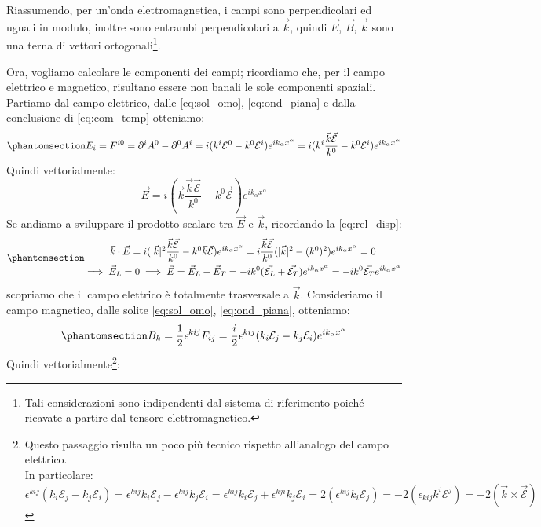 Riassumendo, per un'onda elettromagnetica, i campi sono perpendicolari ed uguali in modulo, inoltre sono entrambi perpendicolari a $\Vec{k}$, quindi $\Vec{E}$, $\Vec{B}$, $\Vec{k}$ sono una terna di vettori ortogonali\footnote{Tali considerazioni sono indipendenti dal sistema di riferimento poiché ricavate a partire dal tensore elettromagnetico.}. 

Ora, vogliamo calcolare le componenti dei campi; ricordiamo che, per il campo elettrico e magnetico, risultano essere non banali le sole componenti spaziali. Partiamo dal campo elettrico, dalle \eqref{eq:sol_omo}, \eqref{eq:ond_piana} e dalla conclusione di \eqref{eq:com_temp} otteniamo:
\begin{equation}\phantomsection\label{eq:Comp_camp_ele}
    E_i=F^{i0}=\partial^i A^0 -\partial^0 A^i=i(k^i\mathcal{E}^0-k^0\mathcal{E}^i)e^{ik_\alpha x^\alpha}=i(k^i\dfrac{\Vec{k}\Vec{\mathcal{E}}}{k^0}-k^0\mathcal{E}^i)e^{ik_\alpha x^\alpha}
    \end{equation}
    Quindi vettorialmente:
    \begin{equation} 
    \Vec{E}=i(\Vec{k}\dfrac{\Vec{k}\Vec{\mathcal{E}}}{k^0}-k^0\Vec{\mathcal{E}})e^{ik_\alpha x^\alpha}
\end{equation}
Se andiamo a sviluppare il prodotto scalare tra $\Vec{E}$ e $\Vec{k}$, ricordando la \eqref{eq:rel_disp}:
\begin{equation}\phantomsection\label{eq:camp_ele}
\begin{gathered}
  \Vec{k}\cdot\Vec{E}=i(|\Vec{k}|^2\dfrac{\Vec{k}\Vec{\mathcal{E}}}{k^0}-k^0\Vec{k}\Vec{\mathcal{E}})e^{ik_\alpha x^\alpha}=i\dfrac{\Vec{k}\Vec{\mathcal{E}}}{k^0}(|\Vec{k}|^2-(k^0)^2)e^{ik_\alpha x^\alpha}=0\\
  \implies\Vec{E}_L=0\implies\Vec{E}=\Vec{E}_L+\Vec{E}_T=-ik^0(\Vec{\mathcal{E}_L}+\Vec{\mathcal{E}_T})e^{ik_\alpha x^\alpha}=-ik^0\Vec{\mathcal{E}_T}e^{ik_\alpha x^\alpha}
\end{gathered}
\end{equation}
scopriamo che il campo elettrico è totalmente trasversale a $\Vec{k}$.
Consideriamo il campo magnetico, dalle solite \eqref{eq:sol_omo}, \eqref{eq:ond_piana}, otteniamo:
\begin{equation}\phantomsection\label{eq:Comp_camp_magn}
    B_k=\dfrac{1}{2}\epsilon^{kij}F_{ij}=\dfrac{i}{2}\epsilon^{kij}(k_i\mathcal{E}_j-k_j\mathcal{E}_i)e^{ik_\alpha x^\alpha}
    \end{equation}
Quindi vettorialmente\footnote{Questo passaggio risulta un poco più tecnico rispetto all'analogo del campo elettrico.\\ In particolare: $\epsilon^{kij}(k_i\mathcal{E}_j-k_j\mathcal{E}_i)=\epsilon^{kij}k_i\mathcal{E}_j-\epsilon^{kij}k_j\mathcal{E}_i=\epsilon^{kij}k_i\mathcal{E}_j+\epsilon^{kji}k_j\mathcal{E}_i=2(\epsilon^{kij}k_i\mathcal{E}_j)=-2(\epsilon_{kij}k^i\mathcal{E}^j)=-2(\Vec{k}\times\Vec{\mathcal{E}})$}:

